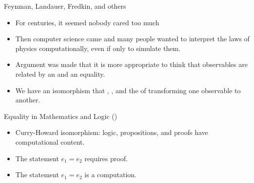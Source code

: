 \documentclass[11pt]{beamer}
\newcommand{\red}[1]{{\color{red}{#1}}}
\newcommand{\blue}[1]{{\color{blue}{#1}}}
\begin{document}
\begin{frame}{Feynman, Landauer, Fredkin, and others}

\begin{itemize}

\vfill\item For centuries, it seemed nobody cared too much

\vfill\item Then computer science came and many people wanted to interpret
the laws of physics computationally, even if only to simulate them.

\vfill\item Argument was made that it is more appropriate to think that
\red{different} observables are related by an \red{isomorphism} and \red{not}
an equality.

\vfill\item We have an isomorphism that \red{witnesses}, \red{explains}, and
\red{models} the \red{process} of transforming one observable to another.

\end{itemize}

\vfill

\end{frame}

\begin{frame}{Equality in Mathematics and Logic (\blue{Prehistory})}

\begin{itemize}

\vfill\item Curry-Howard isomorphism: logic, propositions, and
  proofs have computational content.

\vfill\item The statement $e_1 = e_2$ requires proof. 

\vfill\item The statement $e_1 = e_2$ is a computation.

\end{itemize}

\vfill

\end{frame}
\end{document}
